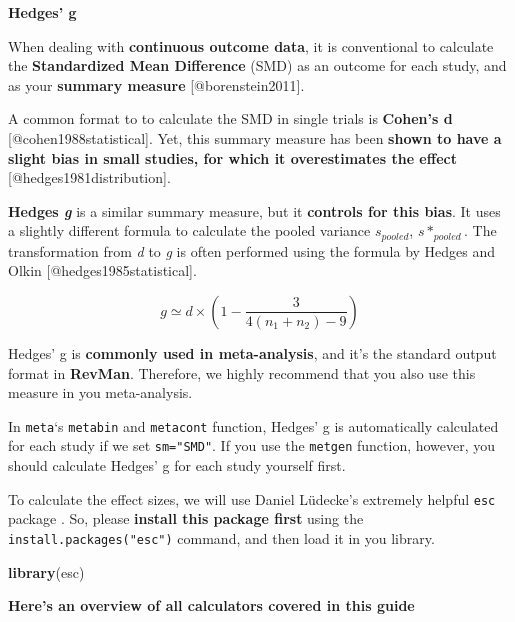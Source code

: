 \documentclass[]{book}
\newenvironment{Shaded}{\begin{snugshade}}{\end{snugshade}}
\newcommand{\KeywordTok}[1]{\textcolor[rgb]{0.13,0.29,0.53}{\textbf{#1}}}
\newcommand{\NormalTok}[1]{#1}
\begin{document}
\begin{rmdinfo}
\textbf{Hedges' g}

When dealing with \textbf{continuous outcome data}, it is conventional
to calculate the \textbf{Standardized Mean Difference} (SMD) as an
outcome for each study, and as your \textbf{summary measure}
{[}@borenstein2011{]}.

A common format to to calculate the SMD in single trials is
\textbf{Cohen's d} {[}@cohen1988statistical{]}. Yet, this summary
measure has been \textbf{shown to have a slight bias in small studies,
for which it overestimates the effect} {[}@hedges1981distribution{]}.

\textbf{Hedges \emph{g} } is a similar summary measure, but it
\textbf{controls for this bias}. It uses a slightly different formula to
calculate the pooled variance \(s_{pooled}\), \(s*_{pooled}\). The
transformation from \emph{d} to \emph{g} is often performed using the
formula by Hedges and Olkin {[}@hedges1985statistical{]}.

\[g \simeq d\times(1-\frac{3}{4(n_1+n_2)-9}) \]
\end{rmdinfo}

\begin{rmdachtung}
Hedges' g is \textbf{commonly used in meta-analysis}, and it's the
standard output format in \textbf{RevMan}. Therefore, we highly
recommend that you also use this measure in you meta-analysis.

In \texttt{meta}`s \texttt{metabin} and \texttt{metacont} function,
Hedges' g is automatically calculated for each study if we set
\texttt{sm="SMD"}. If you use the \texttt{metgen} function, however, you
should calculate Hedges' g for each study yourself first.
\end{rmdachtung}

To calculate the effect sizes, we will use Daniel Lüdecke's extremely helpful \texttt{esc} package \citep{esc}. So, please \textbf{install this package first} using the \texttt{install.packages("esc")} command, and then load it in you library.

\begin{Shaded}
\begin{Highlighting}[]
\KeywordTok{library}\NormalTok{(esc)}
\end{Highlighting}
\end{Shaded}

\textbf{Here's an overview of all calculators covered in this guide}
\end{document}
